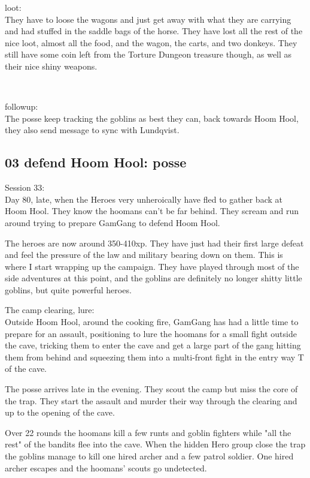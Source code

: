 
loot:\\
They have to loose the wagons and just get away with what they are carrying and had stuffed in the saddle bags of the horse. They have lost all the rest of the nice loot, almost all the food, and the wagon, the carts, and two donkeys. They still have some coin left from the Torture Dungeon treasure though, as well as their nice shiny weapons.

\

followup:\\
The posse keep tracking the goblins as best they can, back towards Hoom Hool, they also send message to sync with Lundqvist.


\subsection*{03 defend Hoom Hool: posse}

\forceindent Session 33:\\                                              %
Day 80, late, when the Heroes very unheroically have fled to gather back at Hoom Hool. They know the hoomans can't be far behind. They scream and run around trying to prepare GamGang to defend Hoom Hool.

\begin{readoutloud}
The heroes are now around 350-410xp. They have just had their first large defeat and feel the pressure of the law and military bearing down on them. This is where I start wrapping up the campaign. They have played through most of the side adventures at this point, and the goblins are definitely no longer shitty little goblins, but quite powerful heroes.
\end{readoutloud}

The camp clearing, lure:\\
Outside Hoom Hool, around the cooking fire, GamGang has had a little time to prepare for an assault, positioning to lure the hoomans for a small fight outside the cave, tricking them to enter the cave and get a large part of the gang hitting them from behind and squeezing them into a multi-front fight in the entry way T of the cave.

The posse arrives late in the evening. They scout the camp but miss the core of the trap. They start the assault and murder their way through the clearing and up to the opening of the cave. 

Over 22 rounds the hoomans kill a few runts and goblin fighters while "all the rest" of the bandits flee into the cave. When the hidden Hero group close the trap the goblins manage to kill one hired archer and a few patrol soldier. One hired archer escapes and the hoomans' scouts go undetected.

